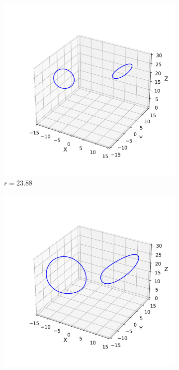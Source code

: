 \documentclass[paper=a4, fontsize=11pt]{scrartcl}
\numberwithin{equation}{section}		%
\numberwithin{figure}{section}			%
\numberwithin{table}{section}				%
\begin{document}
\begin{figure}[hbt!]
	\centering
	
	\begin{subfigure}[b]{0.495\textwidth}
		\centering
		\includegraphics[width=\textwidth]{media/orbit_r_23.88.png}
		\caption{$r = 23.88$}
		\label{fig:sub1}
	\end{subfigure}
	\hfill
	\begin{subfigure}[b]{0.495\textwidth}
		\centering
		\includegraphics[width=\textwidth]{media/orbit_r_20.67.png}

\end{subfigure}
\end{figure}
\end{document}

